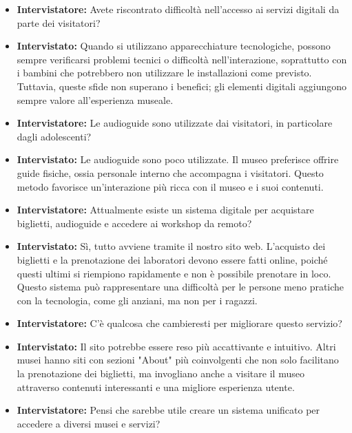 \documentclass{article}
\begin{document}
\begin{itemize}
    \item \textbf{Intervistatore:} Avete riscontrato difficoltà nell'accesso ai servizi digitali da parte dei visitatori?
    
    \item \textbf{Intervistato:} Quando si utilizzano apparecchiature tecnologiche, possono sempre verificarsi problemi tecnici o difficoltà nell'interazione, soprattutto con i bambini che potrebbero non utilizzare le installazioni come previsto. Tuttavia, queste sfide non superano i benefici; gli elementi digitali aggiungono sempre valore all'esperienza museale.
    
    \item \textbf{Intervistatore:} Le audioguide sono utilizzate dai visitatori, in particolare dagli adolescenti?
    
    \item \textbf{Intervistato:} Le audioguide sono poco utilizzate. Il museo preferisce offrire guide fisiche, ossia personale interno che accompagna i visitatori. Questo metodo favorisce un'interazione più ricca con il museo e i suoi contenuti.
    
    \item \textbf{Intervistatore:} Attualmente esiste un sistema digitale per acquistare biglietti, audioguide e accedere ai workshop da remoto?
    
    \item \textbf{Intervistato:} Sì, tutto avviene tramite il nostro sito web. L'acquisto dei biglietti e la prenotazione dei laboratori devono essere fatti online, poiché questi ultimi si riempiono rapidamente e non è possibile prenotare in loco. Questo sistema può rappresentare una difficoltà per le persone meno pratiche con la tecnologia, come gli anziani, ma non per i ragazzi.
    
    \item \textbf{Intervistatore:} C'è qualcosa che cambieresti per migliorare questo servizio?
    
    \item \textbf{Intervistato:} Il sito potrebbe essere reso più accattivante e intuitivo. Altri musei hanno siti con sezioni "About" più coinvolgenti che non solo facilitano la prenotazione dei biglietti, ma invogliano anche a visitare il museo attraverso contenuti interessanti e una migliore esperienza utente.
    
    \item \textbf{Intervistatore:} Pensi che sarebbe utile creare un sistema unificato per accedere a diversi musei e servizi?
    

\end{itemize}
\end{document}
